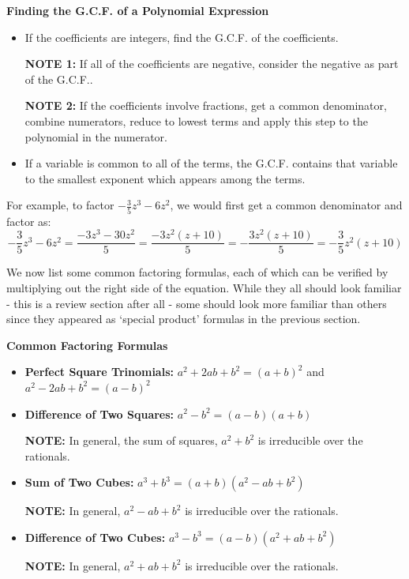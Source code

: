 \documentclass{ximera}
\begin{document}
 

\label{PolynomialGCF}
\centerline{\textbf{Finding the G.C.F. of a Polynomial Expression}}

\begin{itemize}

\item If the coefficients are integers, find the G.C.F. of the coefficients. 

\textbf{NOTE 1:}  If all of the coefficients are negative, consider the negative as part of the G.C.F..

\textbf{NOTE 2:}  If the coefficients involve fractions, get a common denominator, combine numerators, reduce to lowest terms and apply this step to the polynomial in the numerator.

\item  If a variable is common to all of the terms, the G.C.F. contains that variable to the smallest exponent which appears among the terms.

\end{itemize}


 

For example, to factor $-\frac{3}{5}z^3 - 6z^2$, we would first get a common denominator and factor as: \[ -\frac{3}{5}z^3 - 6z^2 = \frac{-3z^3 - 30z^2}{5} = \frac{-3z^2(z + 10)}{5} = -\frac{3z^2(z + 10)}{5} = -\frac{3}{5}z^{2}(z + 10)\]

We now list some common factoring formulas, each of which can be verified by multiplying out the right side of the equation.  While they all should look familiar - this is a review section after all - some should look more familiar than others since they appeared as `special product' formulas in the previous section.  

 

\label{CommonFactoringFormulas}
\centerline{\textbf{Common Factoring Formulas}}

\begin{itemize}

\item \textbf{Perfect Square Trinomials:}  $a^2 + 2ab + b^2 = (a+b)^2$ and $a^2 - 2ab + b^2 = (a-b)^2$
\item  \textbf{Difference of Two Squares:}  $a^2 - b^2 = (a-b)(a+b)$

\textbf{NOTE:}  In general, the sum of squares, $a^2 + b^2$ is irreducible over the rationals.

\item  \textbf{Sum of Two Cubes:}  $a^3 + b^3 = (a + b)(a^2 - ab + b^2)$

\textbf{NOTE:}  In general, $a^2 - ab + b^2$ is irreducible over the rationals.

\item   \textbf{Difference of Two Cubes:}  $a^3 - b^3 = (a - b)(a^2 + ab + b^2)$ 

\textbf{NOTE:}  In general, $a^2 + ab + b^2$ is irreducible over the rationals.
\end{itemize}
\end{document}
